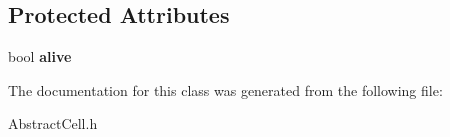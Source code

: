 \subsection*{\-Protected \-Attributes}
\begin{DoxyCompactItemize}
\item 
\hypertarget{classAbstractCell_aa92e42d5bb67f3249d8e2dde2c3228e7}{bool {\bfseries alive}}\label{classAbstractCell_aa92e42d5bb67f3249d8e2dde2c3228e7}

\end{DoxyCompactItemize}


\-The documentation for this class was generated from the following file\-:\begin{DoxyCompactItemize}
\item 
\-Abstract\-Cell.\-h\end{DoxyCompactItemize}
